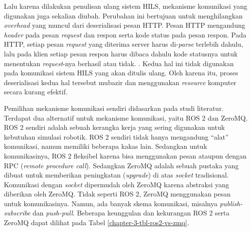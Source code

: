 Lalu karena dilakukan penulisan ulang sistem HILS, mekanisme komunikasi yang
digunakan juga sekalian diubah. Perubahan ini bertujuan untuk menghilangkan
\textit{overhead} yang muncul dari deserialisasi pesan HTTP. Pesan HTTP
mengandung \textit{header} pada pesan \textit{request} dan respon serta kode
status pada pesan respon. Pada HTTP, setiap pesan \textit{request} yang diterima
server harus di-\textit{parse} terlebih dahulu, lalu pada klien setiap pesan
respon harus dibaca dahulu kode statusnya untuk menentukan \textit{request}-nya
berhasil atau tidak. \parencite{rfc9110}. Kedua hal ini tidak digunakan pada
komunikasi sistem HILS yang akan ditulis ulang. Oleh karena itu, proses
deserialisasi kedua hal tersebut mubazir dan menggunakan \textit{resource}
komputer secara kurang efektif.

Pemilihan mekanisme komunikasi sendiri didasarkan pada studi literatur.
Terdapat dua alternatif untuk mekanisme komunikasi, yaitu ROS 2 dan ZeroMQ.
ROS 2 sendiri adalah sebuah kerangka kerja yang sering digunakan untuk kebutuhan
simulasi robotik. ROS 2 sendiri tidak hanya mengandung ``alat'' komunikasi,
namun memiliki beberapa kakas lain. Sedangkan untuk komunikasinya, ROS 2
fleksibel karena bisa menggunakan pesan ataupun dengan RPC (\textit{remote
	procedure call}). Sedangkan ZeroMQ adalah sebuah pustaka yang dibuat untuk
memberikan peningkatan (\textit{upgrade}) di atas \textit{socket}
tradisional. Komunikasi dengan \textit{socket} dipermudah oleh ZeroMQ karena
abstraksi yang diberikan oleh ZeroMQ. Tidak seperti ROS 2, ZeroMQ menggunakan
pesan untuk komunikasinya. Namun, ada banyak skema komunikasi, misalnya
\textit{publish-subscribe} dan \textit{push-pull}. Beberapa keunggulan dan
kekurangan ROS 2 serta ZeroMQ dapat dilihat pada Tabel
\ref{chapter-3-tbl-ros2-vs-zmq}.

